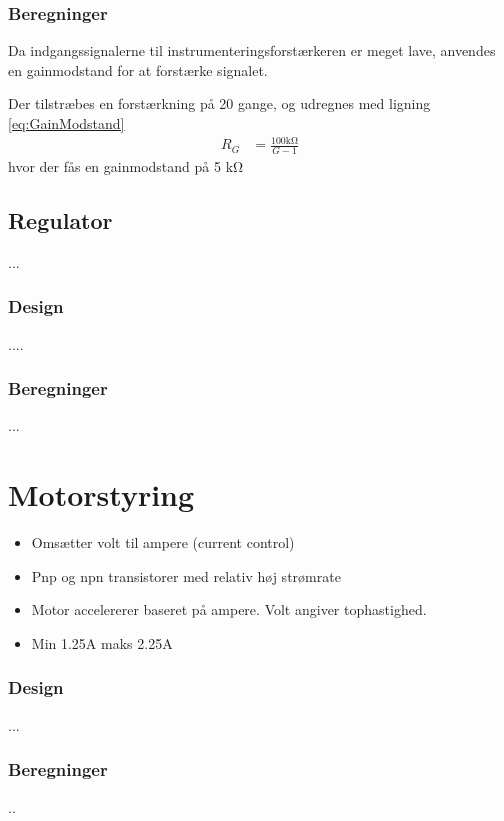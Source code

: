 \subsubsection{Beregninger}
Da indgangssignalerne til instrumenteringsforstærkeren er meget lave, anvendes en gainmodstand for at forstærke signalet.

Der tilstræbes en forstærkning på 20 gange, og udregnes med ligning \ref{eq:GainModstand}
\begin{align}
	R_G & = \frac{100 \si{\kilo\ohm}}{G-1} \label{eq:GainModstand}
\end{align}
hvor der fås en gainmodstand på 5 \si{\kilo\ohm}

\subsection{Regulator}
...

\subsubsection{Design}
....
\subsubsection{Beregninger}
...

\section{Motorstyring}\label{sec:sec_motorstyring}

\begin{itemize}
	\item Omsætter volt til ampere (current control)
	\item Pnp og npn transistorer med relativ høj strømrate
	\item Motor accelererer baseret på ampere. Volt angiver tophastighed.
	\item Min 1.25A maks 2.25A
\end{itemize}

\subsubsection{Design}
...

\subsubsection{Beregninger}
..
